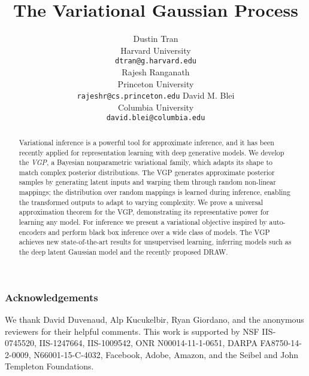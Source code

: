 \documentclass{article} %
\title{The Variational Gaussian Process}
\author{
Dustin Tran \\
Harvard University \\
\texttt{dtran@g.harvard.edu} \\
\AND
Rajesh Ranganath \\
Princeton University \\
\texttt{rajeshr@cs.princeton.edu}
\AND
David M. Blei \\
Columbia University \\
\texttt{david.blei@columbia.edu}
}
\begin{document}
\maketitle

\begin{abstract}
Variational inference is a powerful tool for approximate inference,
and it
has been recently applied for representation learning with deep generative models.
We develop the \emph{\gls{VGP}}, a Bayesian nonparametric
variational family, which adapts its shape to match complex posterior distributions.
The \gls{VGP} generates approximate posterior samples by generating
latent inputs and warping them through random non-linear mappings; the
distribution over random mappings is
learned during inference, enabling the transformed outputs to
adapt to varying complexity. We prove a universal approximation theorem
for the \gls{VGP}, demonstrating its representative power for learning
any model. For
inference we present a variational objective inspired by
auto-encoders and perform black box inference over a wide class of
models.
The \gls{VGP} achieves new state-of-the-art results for
unsupervised learning, inferring models such as the
deep latent Gaussian model and the recently proposed DRAW.
\end{abstract}








\subsubsection*{Acknowledgements}
We thank David Duvenaud, Alp Kucukelbir, Ryan Giordano, and the
anonymous reviewers for their helpful comments.
This work is supported by NSF IIS-0745520, IIS-1247664, IIS-1009542, ONR N00014-11-1-0651, DARPA FA8750-14-2-0009, N66001-15-C-4032, Facebook, Adobe, Amazon, and the Seibel and John Templeton Foundations.




\appendix

\end{document}
